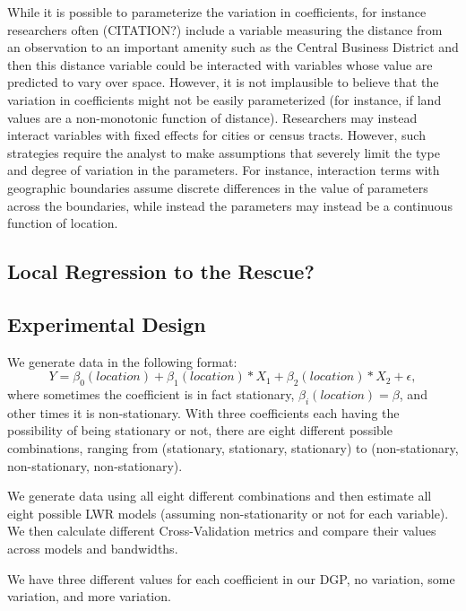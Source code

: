 \documentclass{article}\usepackage{graphicx, color}
\begin{document}
While it is possible to parameterize the variation in coefficients, for instance researchers often (CITATION?) include a variable measuring the distance from an observation to an important amenity such as the Central Business District and then this distance variable could be interacted with variables whose value are predicted to vary over space. However, it is not implausible to believe that the variation in coefficients might not be easily parameterized (for instance, if land values are a non-monotonic function of distance). Researchers may instead interact variables with fixed effects for cities or census tracts. However, such strategies require the analyst to make assumptions that severely limit the type and degree of variation in the parameters. For instance, interaction terms with geographic boundaries assume discrete differences in the value of parameters across the boundaries, while instead the parameters may instead be a continuous function of location.

\subsection{Local Regression to the Rescue?}


\subsection{Experimental Design}

We generate data in the following format:
\begin{equation}
Y = \beta _0(location) + \beta _1(location) *X_1 + \beta _2(location) * X_2 + \epsilon ,
\end{equation}
where sometimes the coefficient is in fact stationary, $\beta _i(location) = \beta$, and other times it is non-stationary. With three coefficients each having the possibility of being stationary or not, there are eight different possible combinations, ranging from (stationary, stationary, stationary) to (non-stationary, non-stationary, non-stationary).

We generate data using all eight different combinations and then estimate all eight possible LWR models (assuming non-stationarity or not for each variable). We then calculate different Cross-Validation metrics and compare their values across models and bandwidths. 

We have three different values for each coefficient in our DGP, no variation, some variation, and more variation.
\end{document}
